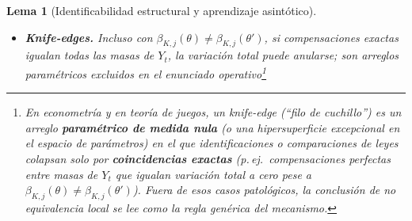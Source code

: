 \documentclass[12pt]{article}
\newtheorem{lemma}[theorem]{Lema}
\theoremstyle{definition}
\theoremstyle{remark}
\newcommand{\1}{\mathbf{1}}
\begin{document}
\begin{lemma}[Identificabilidad estructural y aprendizaje asintótico]
\begin{itemize}
  \item[\textup{(C2)}] \textbf{\emph{Knife-edges}.} Incluso con $\beta_{K,j}(\theta)\neq\beta_{K,j}(\theta')$, si compensaciones exactas igualan todas las masas de $Y_t$, la variación total puede anularse; son arreglos paramétricos excluidos en el enunciado operativo\footnote{En econometría y en teoría de juegos, un \emph{knife-edge} \textup{(}``filo de cuchillo''\textup{)} es un arreglo \textbf{paramétrico de medida nula} \textup{(}o una hipersuperficie excepcional en el espacio de parámetros\textup{)} en el que identificaciones o comparaciones de leyes colapsan solo por \textbf{coincidencias exactas} \textup{(}p.\,ej.\ compensaciones perfectas entre masas de $Y_t$ que igualan variación total a cero pese a $\beta_{K,j}(\theta)\neq\beta_{K,j}(\theta')$\textup{)}. Fuera de esos casos patológicos, la conclusión de no equivalencia local se lee como la regla genérica del mecanismo.}
\end{itemize}


\end{lemma}
\end{document}
